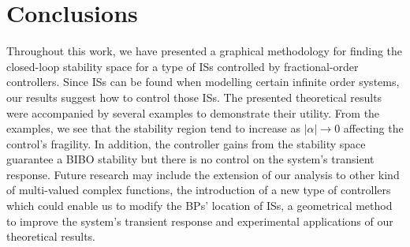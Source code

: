 \documentclass[twoside,reqno,11pt]{fcaa-var} %
\begin{document}
\section{Conclusions}\label{sec:Concl}
Throughout this work, we have presented a graphical methodology for finding the closed-loop stability space for a type of ISs controlled by fractional-order controllers. Since ISs can be found when modelling certain infinite order systems, our results suggest how to control those ISs. The presented theoretical results were accompanied by several examples to demonstrate their utility. From the examples, we see that the stability region tend to increase as $\vert\alpha\vert\rightarrow 0$ affecting the control's fragility. In addition, the controller gains  from the stability space guarantee a BIBO stability but there is no control on the system's transient response. Future research may include the extension of our analysis to other kind of multi-valued complex functions, the introduction of a new type of controllers which could enable us to modify the BPs' location of ISs, a geometrical method to improve the system's transient response and experimental applications of our theoretical results. 





 \bigskip \smallskip

 \it
\end{document}
